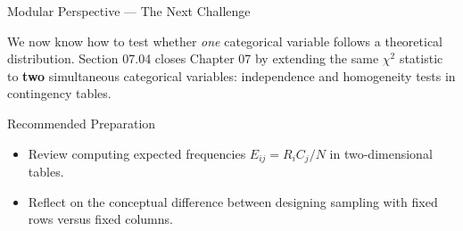 \documentclass[10pt, aspectratio=169]{beamer}
\begin{document}
\begin{frame}{Modular Perspective --- The Next Challenge}
  \scriptsize
  \begin{retoclase}
    We now know how to test whether \emph{one} categorical variable follows a theoretical distribution. Section 07.04 closes Chapter 07 by extending the same $\chi^2$ statistic to \textbf{two} simultaneous categorical variables: independence and homogeneity tests in contingency tables.
  \end{retoclase}

  \vspace{0.08cm}
  \pause
  \begin{alertblock}{Recommended Preparation}
    \begin{itemize}\itemsep=0.06cm
      \item Review computing expected frequencies $E_{ij}=R_iC_j/N$ in two-dimensional tables.
      \item Reflect on the conceptual difference between designing sampling with fixed rows versus fixed columns.
    \end{itemize}
  \end{alertblock}
\end{frame}
\end{document}
